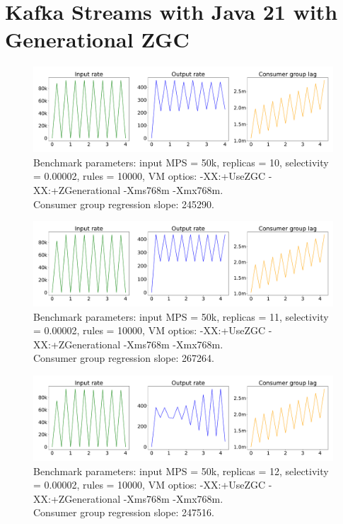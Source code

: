 \newpage

\section{Kafka Streams with Java 21 with Generational ZGC}\label{sec:kafka-streams-on-java-21-with-generational-zgc}

\begin{figure}[H]
    \centering
    \includegraphics[width=1\textwidth]{figures/k-streams-java-21-new-gc-replicas-10}
    \caption{Benchmark parameters: input MPS = 50k, replicas = 10, selectivity = 0.00002, rules = 10000,
        VM optios: -XX:+UseZGC -XX:+ZGenerational -Xms768m -Xmx768m. \\
    Consumer group regression slope: 245290.}
    \label{fig:k-streams-java-21-new-gc-replicas-10}
\end{figure}


\begin{figure}[H]
    \centering
    \includegraphics[width=1\textwidth]{figures/k-streams-java-21-new-gc-replicas-11}
    \caption{Benchmark parameters: input MPS = 50k, replicas = 11, selectivity = 0.00002, rules = 10000,
        VM optios: -XX:+UseZGC -XX:+ZGenerational -Xms768m -Xmx768m. \\
    Consumer group regression slope: 267264.}
    \label{fig:k-streams-java-21-new-gc-replicas-11}
\end{figure}

\begin{figure}[H]
    \centering
    \includegraphics[width=1\textwidth]{figures/k-streams-java-21-new-gc-replicas-12}
    \caption{Benchmark parameters: input MPS = 50k, replicas = 12, selectivity = 0.00002, rules = 10000,
        VM optios: -XX:+UseZGC -XX:+ZGenerational -Xms768m -Xmx768m. \\
    Consumer group regression slope: 247516.}
    \label{fig:k-streams-java-21-new-gc-replicas-12}
\end{figure}


